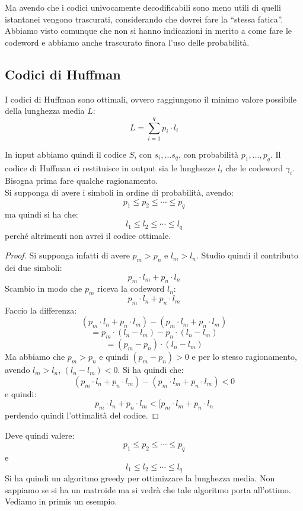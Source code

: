 \documentclass[a4paper,12pt, oneside]{book}
\begin{document}
Ma avendo che i codici univocamente decodificabili sono meno utili di quelli
istantanei vengono trascurati, considerando che dovrei fare la ``stessa
fatica''.\\
Abbiamo visto comunque che non si hanno indicazioni in merito a come fare le
codeword e abbiamo anche trascurato finora l'uso delle probabilità.
\subsection{Codici di Huffman}
I codici di Huffman sono ottimali, ovvero raggiungono il minimo valore possibile
della lunghezza media $L$:
\[L=\sum_{i=1}^q p_i\cdot l_i\]
\begin{teorema}
  In input abbiamo quindi il codice $S$, con $s_i,\ldots s_q$, con probabilità
  $p_1,\ldots, p_q$. Il codice di Huffman ci restituisce in output sia le
  lunghezze $l_i$ che le codeword $\gamma_i$.\\
  Bisogna prima fare qualche ragionamento.\\
  Si supponga di avere i simboli in ordine di probabilità, avendo:
  \[p_1\leq p_2\leq \cdots\leq p_q\]
  ma quindi si ha che:
  \[l_1\leq l_2\leq \cdots \leq l_q\]
  perché altrimenti non avrei il codice ottimale.
\end{teorema}
\begin{proof}
  Si supponga infatti di avere
  $p_m>p_n$ e $l_m>l_n$. Studio quindi il contributo dei due simboli:
  \[p_m\cdot l_m+p_n\cdot l_n\]
  Scambio in modo che $p_m$ riceva la codeword $l_n$:
  \[p_m\cdot l_n+p_n\cdot l_m\]
  Faccio la differenza:
  \[(p_m\cdot l_n+p_n\cdot l_m)-(p_m\cdot l_m+p_n\cdot l_m)\]
  \[=p_m\cdot (l_n-l_m)-p_n\cdot (l_n-l_m)\]
  \[=(p_m-p_n)\cdot(l_n-l_m)\]
  Ma abbiamo che $p_m>p_n$ e quindi $(p_m-p_n)>0$ e per lo stesso ragionamento,
  avendo $l_m>l_n$, $(l_n-l_m)<0$. Si ha quindi che:
  \[(p_m\cdot l_n+p_n\cdot l_m)-(p_m\cdot l_m+p_n\cdot l_m)<0\]
  e quindi:
  \[p_m\cdot l_n+p_n\cdot l_m<[p_m\cdot l_m+p_n\cdot l_n\]
  perdendo quindi l'ottimalità del codice. 
\end{proof}
Deve quindi valere:
\[p_1\leq p_2\leq \cdots\leq p_q\]
e
\[l_1\leq l_2\leq \cdots \leq l_q\]
Si ha quindi un algoritmo greedy per ottimizzare la lunghezza media. Non
sappiamo se si ha un matroide ma si vedrà che tale algoritmo porta
all'ottimo. Vediamo in primis un esempio.
\end{document}
